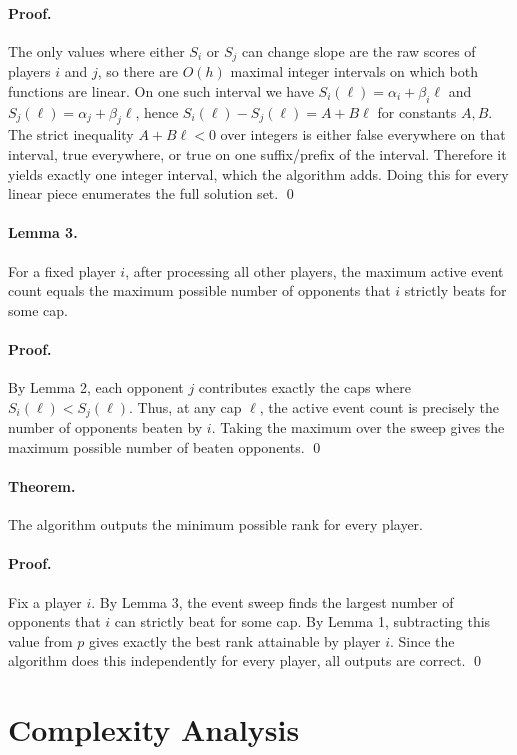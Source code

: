 \documentclass[11pt]{article}
\begin{document}
\paragraph{Proof.}
The only values where either $S_i$ or $S_j$ can change slope are the raw scores of players $i$ and $j$,
so there are $O(h)$ maximal integer intervals on which both functions are linear.
On one such interval we have
$S_i(\ell)=\alpha_i+\beta_i \ell$ and $S_j(\ell)=\alpha_j+\beta_j \ell$, hence
$S_i(\ell)-S_j(\ell)=A+B\ell$ for constants $A,B$.
The strict inequality $A+B\ell<0$ over integers is either false everywhere on that interval,
true everywhere, or true on one suffix/prefix of the interval. Therefore it yields exactly one integer
interval, which the algorithm adds. Doing this for every linear piece enumerates the full solution set.
\qed

\paragraph{Lemma 3.}
For a fixed player $i$, after processing all other players, the maximum active event count equals the
maximum possible number of opponents that $i$ strictly beats for some cap.

\paragraph{Proof.}
By Lemma 2, each opponent $j$ contributes exactly the caps where $S_i(\ell) < S_j(\ell)$.
Thus, at any cap $\ell$, the active event count is precisely the number of opponents beaten by $i$.
Taking the maximum over the sweep gives the maximum possible number of beaten opponents. \qed

\paragraph{Theorem.}
The algorithm outputs the minimum possible rank for every player.

\paragraph{Proof.}
Fix a player $i$. By Lemma 3, the event sweep finds the largest number of opponents that $i$ can
strictly beat for some cap. By Lemma 1, subtracting this value from $p$ gives exactly the best rank
attainable by player $i$. Since the algorithm does this independently for every player, all outputs are
correct. \qed

\section*{Complexity Analysis}
\end{document}
